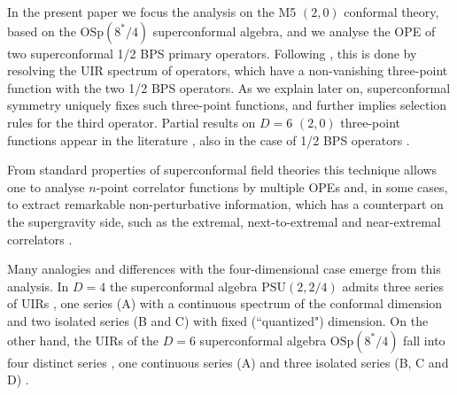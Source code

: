 \documentclass[a4paper,11pt]{article}
\begin{document}
In the present paper we focus the analysis on the M5 $(2,0)$
conformal theory, based on the $\mbox{OSp}(8^{*}/4)$
superconformal algebra, and we analyse the OPE of two
superconformal 1/2 BPS primary operators. Following \cite{AES,ES},
this is done by resolving the UIR spectrum of operators, which
have a non-vanishing three-point function with the two 1/2 BPS
operators. As we explain later on, superconformal symmetry
uniquely fixes such three-point functions, and further implies
selection rules for the third operator. Partial results on $D=6$
$(2,0)$ three-point functions appear in the literature \cite{P6},
also in the case of 1/2 BPS operators \cite{DHref38}.

{}From standard properties of superconformal field theories this
technique allows one to analyse $n$-point correlator functions by
multiple OPEs and, in some cases, to extract remarkable
non-perturbative information, which has a counterpart on the
supergravity side, such as the extremal, next-to-extremal and
near-extremal correlators
\cite{DHoFrMaMaRa,DHoFrMaMaRa1,D'Hoker:2000dm,DP}.

Many analogies and differences with the four-dimensional case
emerge from this analysis. In $D=4$ the superconformal algebra
$\mbox{PSU}(2,2/4)$ admits three series of UIRs \cite{dp}, one
series (A) with a continuous spectrum of the conformal dimension
and two isolated series (B and C) with fixed (``quantized")
dimension. On the other hand, the UIRs of the $D=6$ superconformal
algebra $\mbox{OSp}(8^{*}/4)$ fall into four distinct series
\cite{Minw2}, one continuous series (A) and three isolated series
(B, C and D) \cite{FS2,FS1}.
\end{document}
